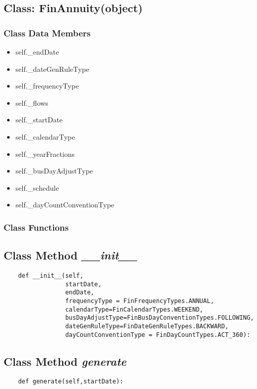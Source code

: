 \documentclass[twoside,11pt]{book}
\begin{document}
\subsection{Class: FinAnnuity(object)}


\subsubsection{Class Data Members}
\begin{itemize}
\item{self.\_endDate}
\item{self.\_dateGenRuleType}
\item{self.\_frequencyType}
\item{self.\_flows}
\item{self.\_startDate}
\item{self.\_calendarType}
\item{self.\_yearFractions}
\item{self.\_busDayAdjustType}
\item{self.\_schedule}
\item{self.\_dayCountConventionType}
\end{itemize}

\subsubsection{Class Functions}

\subsection{Class Method {\it \_\_init\_\_}}


\begin{lstlisting}
    def __init__(self,
                 startDate,
                 endDate,
                 frequencyType = FinFrequencyTypes.ANNUAL,
                 calendarType=FinCalendarTypes.WEEKEND,
                 busDayAdjustType=FinBusDayConventionTypes.FOLLOWING,
                 dateGenRuleType=FinDateGenRuleTypes.BACKWARD, 
                 dayCountConventionType = FinDayCountTypes.ACT_360):
\end{lstlisting}

\subsection{Class Method {\it generate}}


\begin{lstlisting}
    def generate(self,startDate):
\end{lstlisting}
\end{document}
